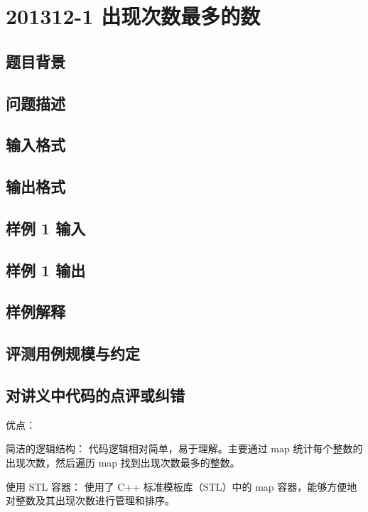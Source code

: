 \section{201312-1 出现次数最多的数}

\subsection{题目背景}

\subsection{问题描述}

\subsection{输入格式}

\subsection{输出格式}

\subsection{样例 1 输入}

\subsection{样例 1 输出}

\subsection{样例解释}

\subsection{评测用例规模与约定}

\subsection{对讲义中代码的点评或纠错}
 
优点：

简洁的逻辑结构： 代码逻辑相对简单，易于理解。主要通过 map 统计每个整数的出现次数，然后遍历 map 找到出现次数最多的整数。

使用 STL 容器： 使用了 C++ 标准模板库（STL）中的 map 容器，能够方便地对整数及其出现次数进行管理和排序。

